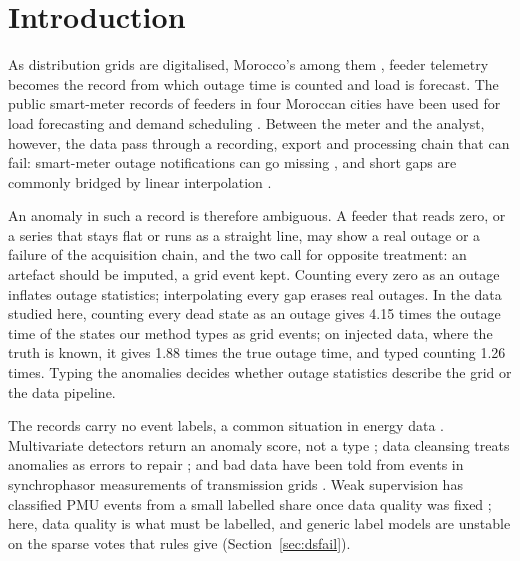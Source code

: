 \section{Introduction}\label{sec:intro}

As distribution grids are digitalised, Morocco's among them \cite{elmaghraoui2026morocco}, feeder telemetry becomes the record from which outage time is counted and load is forecast. The public smart-meter records of feeders in four Moroccan cities \cite{bensalah2025uci,bensalah2025dib} have been used for load forecasting \cite{bensalah2025opsearch} and demand scheduling \cite{sarange2026}. Between the meter and the analyst, however, the data pass through a recording, export and processing chain that can fail: smart-meter outage notifications can go missing \cite{jiang2016outage}, and short gaps are commonly bridged by linear interpolation \cite{peppanen2016imputation}.

An anomaly in such a record is therefore ambiguous. A feeder that reads zero, or a series that stays flat or runs as a straight line, may show a real outage or a failure of the acquisition chain, and the two call for opposite treatment: an artefact should be imputed, a grid event kept. Counting every zero as an outage inflates outage statistics; interpolating every gap erases real outages. In the data studied here, counting every dead state as an outage gives 4.15 times the outage time of the states our method types as grid events; on injected data, where the truth is known, it gives 1.88 times the true outage time, and typed counting 1.26 times. Typing the anomalies decides whether outage statistics describe the grid or the data pipeline.

The records carry no event labels, a common situation in energy data \cite{fan2018autoencoder}. Multivariate detectors return an anomaly score, not a type \cite{hundman2018spacecraft,audibert2020usad,deng2021gdn}; data cleansing treats anomalies as errors to repair \cite{chen2010cleansing,mateos2013cleansing}; and bad data have been told from events in synchrophasor measurements of transmission grids \cite{wu2017lowquality,wu2021iforest}. Weak supervision has classified PMU events from a small labelled share once data quality was fixed \cite{liu2022weakly}; here, data quality is what must be labelled, and generic label models are unstable on the sparse votes that rules give (Section~\ref{sec:dsfail}).

